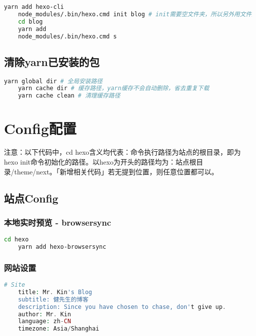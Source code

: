 \begin{lstlisting}[language={bash},title={本地安装hexo}]
    yarn add hexo-cli
    node_modules/.bin/hexo.cmd init blog # init需要空文件夹，所以另外用文件夹「blog」来初始化hexo
    cd blog
    yarn add
    node_modules/.bin/hexo.cmd s
\end{lstlisting}

\subsection{清除yarn已安装的包}
\begin{lstlisting}[language={bash},title={命令查看yarn相关路径}]
    yarn global dir # 全局安装路径
    yarn cache dir # 缓存路径，yarn缓存不会自动删除，省去重复下载
    yarn cache clean # 清理缓存路径
\end{lstlisting}

\section{Config配置}

\begin{intro}
    注意：以下代码中，cd hexo含义均代表：命令执行路径为站点的根目录，即为hexo init命令初始化的路径。以hexo为开头的路径均为：站点根目录/theme/next。「新增相关代码」若无提到位置，则任意位置都可以。
\end{intro}

\subsection{站点Config}
\subsubsection{本地实时预览 - browsersync}
\begin{lstlisting}[language={bash},title={安装插件hexo-browsersync}]
    cd hexo
    yarn add hexo-browsersync
\end{lstlisting}

\subsubsection{网站设置}
\begin{lstlisting}[language={PHP},title={搜索站点Config.yml相关代码并修改}]
    # Site
    title: Mr. Kin's Blog
    subtitle: 健先生的博客
    description: Since you have chosen to chase, don't give up.
    author: Mr. Kin
    language: zh-CN
    timezone: Asia/Shanghai
\end{lstlisting}

